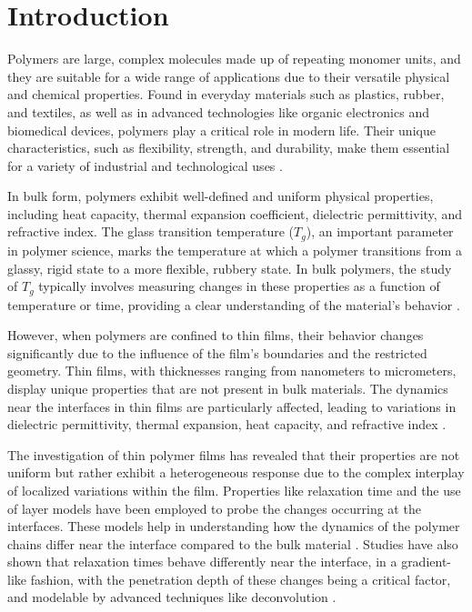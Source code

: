 \chapter{Introduction}


Polymers are large, complex molecules made up of repeating monomer units, and they are suitable for a wide range of applications due to their versatile physical and chemical properties. Found in everyday materials such as plastics, rubber, and textiles, as well as in advanced technologies like organic electronics and biomedical devices, polymers play a critical role in modern life. Their unique characteristics, such as flexibility, strength, and durability, make them essential for a variety of industrial and technological uses \cite{cheng2024}.

In bulk form, polymers exhibit well-defined and uniform physical properties, including heat capacity, thermal expansion coefficient, dielectric permittivity, and refractive index. The glass transition temperature (\(T_g\)), an important parameter in polymer science, marks the temperature at which a polymer transitions from a glassy, rigid state to a more flexible, rubbery state. In bulk polymers, the study of \(T_g\) typically involves measuring changes in these properties as a function of temperature or time, providing a clear understanding of the material’s behavior \cite{saito1959glass}.

However, when polymers are confined to thin films, their behavior changes significantly due to the influence of the film’s boundaries and the restricted geometry. Thin films, with thicknesses ranging from nanometers to micrometers, display unique properties that are not present in bulk materials. The dynamics near the interfaces in thin films are particularly affected, leading to variations in dielectric permittivity, thermal expansion, heat capacity, and refractive index \cite{winkler2021}.

The investigation of thin polymer films has revealed that their properties are not uniform but rather exhibit a heterogeneous response due to the complex interplay of localized variations within the film. Properties like relaxation time and the use of layer models have been employed to probe the changes occurring at the interfaces. These models help in understanding how the dynamics of the polymer chains differ near the interface compared to the bulk material \cite{serghei}. Studies have also shown that relaxation times behave differently near the interface, in a gradient-like fashion, with the penetration depth of these changes being a critical factor, and modelable by advanced techniques like deconvolution \cite{cheng2024}.

